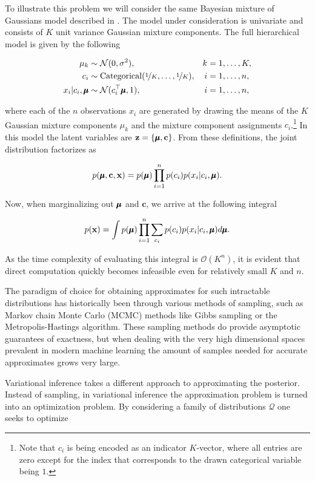 To illustrate this problem we will consider the same Bayesian mixture of Gaussians model described in \cite{variational_inference_review}. The model under consideration is univariate and consists of $K$ unit variance Gaussian mixture components. The full hierarchical model is given by the following

\begin{align*}
\mu_k                       &\sim \mathcal{N}(0, \sigma^2),                                     & k &= 1, \dotsc, K,\\
c_i                         &\sim \text{Categorical}(\nicefrac{1}{K}, \dotsc, \nicefrac{1}{K}), & i &= 1, \dotsc, n,\\
x_i \vert c_i, \pmb{\mu} &\sim \mathcal{N}(c^{\top}_i \pmb{\mu}, 1),                      & i &= 1, \dotsc, n,
\end{align*}

where each of the $n$ observations $x_i$ are generated by drawing the means of the $K$ Gaussian mixture components $\mu_k$ and the mixture component assignments $c_i$.\footnote{Note that $c_i$ is being encoded as an indicator $K$-vector, where all entries are zero except for the index that corresponds to the drawn categorical variable being $1$.} In this model the latent variables are $\mathbf{z} = \{\pmb{\mu}, \mathbf{c}\}$. From these definitions, the joint distribution factorizes as

$$p(\pmb{\mu}, \mathbf{c}, \mathbf{x}) = p(\pmb{\mu}) \prod_{i=1}^{n} p(c_i) p(x_i \vert c_i, \pmb{\mu}).$$

Now, when marginalizing out $\pmb{\mu}$ and $\mathbf{c}$, we arrive at the following integral

$$p(\mathbf{x}) = \int p(\pmb{\mu}) \prod_{i=1}^{n} \sum_{c_i} p(c_i) p(x_i \vert c_i, \pmb{\mu}) d\pmb{\mu}.$$

As the time complexity of evaluating this integral is $\mathcal{O}(K^n)$, it is evident that direct computation quickly becomes infeasible even for relatively small $K$ and $n$.

The paradigm of choice for obtaining approximates for such intractable distributions has historically been through various methods of sampling, such as Markov chain Monte Carlo (MCMC) methods like Gibbs sampling or the Metropolis-Hastings algorithm. These sampling methods do provide asymptotic guarantees of exactness, but when dealing with the very high dimensional spaces prevalent in modern machine learning the amount of samples needed for accurate approximates grows very large.

Variational inference takes a different approach to approximating the posterior. Instead of sampling, in variational inference the approximation problem is turned into an optimization problem. By considering a family of distributions $\mathcal{Q}$ one seeks to optimize


